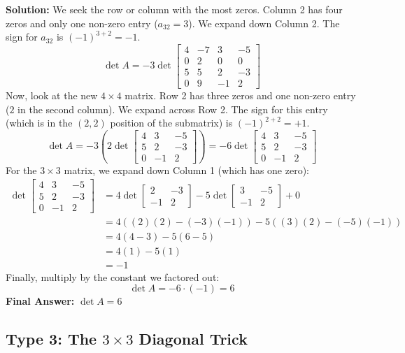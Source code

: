 \documentclass{article}
\begin{document}
\textbf{Solution:}
We seek the row or column with the most zeros. Column 2 has four zeros and only one non-zero entry ($a_{32} = 3$). We expand down Column 2. The sign for $a_{32}$ is $(-1)^{3+2} = -1$.
\[ \det A = -3 \det \begin{bmatrix} 4 & -7 & 3 & -5 \\ 0 & 2 & 0 & 0 \\ 5 & 5 & 2 & -3 \\ 0 & 9 & -1 & 2 \end{bmatrix} \]
Now, look at the new $4 \times 4$ matrix. Row 2 has three zeros and one non-zero entry ($2$ in the second column). We expand across Row 2. The sign for this entry (which is in the $(2,2)$ position of the submatrix) is $(-1)^{2+2} = +1$.
\[ \det A = -3 \left( 2 \det \begin{bmatrix} 4 & 3 & -5 \\ 5 & 2 & -3 \\ 0 & -1 & 2 \end{bmatrix} \right) = -6 \det \begin{bmatrix} 4 & 3 & -5 \\ 5 & 2 & -3 \\ 0 & -1 & 2 \end{bmatrix} \]
For the $3 \times 3$ matrix, we expand down Column 1 (which has one zero):
\begin{align*}
\det \begin{bmatrix} 4 & 3 & -5 \\ 5 & 2 & -3 \\ 0 & -1 & 2 \end{bmatrix} &= 4 \det \begin{bmatrix} 2 & -3 \\ -1 & 2 \end{bmatrix} - 5 \det \begin{bmatrix} 3 & -5 \\ -1 & 2 \end{bmatrix} + 0 \\
&= 4((2)(2) - (-3)(-1)) - 5((3)(2) - (-5)(-1)) \\
&= 4(4 - 3) - 5(6 - 5) \\
&= 4(1) - 5(1) \\
&= -1
\end{align*}
Finally, multiply by the constant we factored out:
\[ \det A = -6 \cdot (-1) = 6 \]
\textbf{Final Answer:} $\det A = 6$

\subsection{Type 3: The $3 \times 3$ Diagonal Trick}
\end{document}
